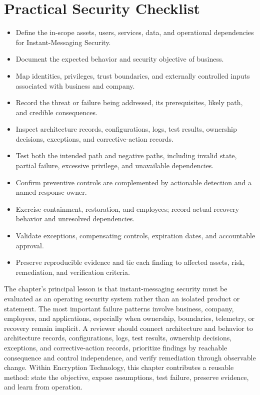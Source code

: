 \documentclass[11pt]{article}
\begin{document}
\section*{Practical Security Checklist}
\begin{itemize}[label=$\square$]
\item Define the in-scope assets, users, services, data, and operational dependencies for Instant-Messaging Security.
\item Document the expected behavior and security objective of business.
\item Map identities, privileges, trust boundaries, and externally controlled inputs associated with business and company.
\item Record the threat or failure being addressed, its prerequisites, likely path, and credible consequences.
\item Inspect architecture records, configurations, logs, test results, ownership decisions, exceptions, and corrective-action records.
\item Test both the intended path and negative paths, including invalid state, partial failure, excessive privilege, and unavailable dependencies.
\item Confirm preventive controls are complemented by actionable detection and a named response owner.
\item Exercise containment, restoration, and employees; record actual recovery behavior and unresolved dependencies.
\item Validate exceptions, compensating controls, expiration dates, and accountable approval.
\item Preserve reproducible evidence and tie each finding to affected assets, risk, remediation, and verification criteria.
\end{itemize}
\begin{synthesisbox}
The chapter's principal lesson is that instant-messaging security must be evaluated as an operating security system rather than an isolated product or statement. The most important failure patterns involve business, company, employees, and applications, especially when ownership, boundaries, telemetry, or recovery remain implicit. A reviewer should connect architecture and behavior to architecture records, configurations, logs, test results, ownership decisions, exceptions, and corrective-action records, prioritize findings by reachable consequence and control independence, and verify remediation through observable change. Within Encryption Technology, this chapter contributes a reusable method: state the objective, expose assumptions, test failure, preserve evidence, and learn from operation.
\end{synthesisbox}
\end{document}
